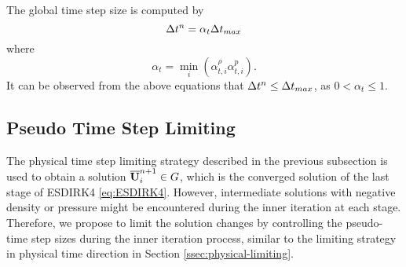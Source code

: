 The global time step size is computed by
\begin{equation}
    \mathrm\Delta t^n = \alpha_t \mathrm\Delta t_{max}
\end{equation}
where
\begin{equation}
    \alpha_t = \min_i(\alpha_{t,i}^{\rho}\alpha_{t,i}^{p}).
\end{equation}
It can be observed from the above equations that $\mathrm\Delta t^n \leq \mathrm\Delta t_{max}$, as $0<\alpha_t \leq 1$.

\subsection{Pseudo Time Step Limiting}
\label{ssec:pseudo-limiting}

The physical time step limiting strategy described in the previous subsection is used to obtain a solution $\overline{\mathbf{U}}_i^{n+1} \in G$, which is the converged solution of the last stage of ESDIRK4 \eqref{eq:ESDIRK4}. However, intermediate solutions with negative density or pressure might be encountered during the inner iteration at each stage. Therefore, we propose to limit the solution changes by controlling the pseudo-time step sizes during the inner iteration process, similar to the limiting strategy in physical time direction in Section \ref{ssec:physical-limiting}.


